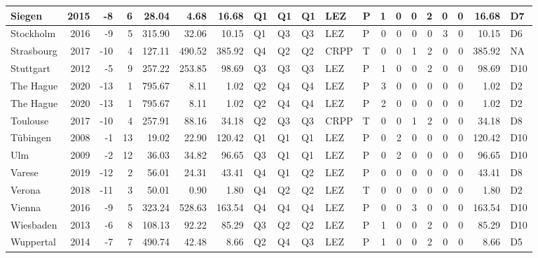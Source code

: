 \begin{tabular}{l|r|r|r|r|r|r|l|l|l|l|l|r|r|r|r|r|r|r|l}
\hline
Siegen & 2015 & -8 & 6 & 28.04 & 4.68 & 16.68 & Q1 & Q1 & Q1 & LEZ & P & 1 & 0 & 0 & 2 & 0 & 0 & 16.68 & D7\\
\hline
Stockholm & 2016 & -9 & 5 & 315.90 & 32.06 & 10.15 & Q1 & Q3 & Q3 & LEZ & P & 0 & 0 & 0 & 0 & 3 & 0 & 10.15 & D6\\
\hline
Strasbourg & 2017 & -10 & 4 & 127.11 & 490.52 & 385.92 & Q4 & Q2 & Q2 & CRPP & T & 0 & 0 & 1 & 2 & 0 & 0 & 385.92 & NA\\
\hline
Stuttgart & 2012 & -5 & 9 & 257.22 & 253.85 & 98.69 & Q3 & Q3 & Q3 & LEZ & P & 1 & 0 & 0 & 2 & 0 & 0 & 98.69 & D10\\
\hline
The Hague & 2020 & -13 & 1 & 795.67 & 8.11 & 1.02 & Q2 & Q4 & Q4 & LEZ & P & 3 & 0 & 0 & 0 & 0 & 0 & 1.02 & D2\\
\hline
The Hague & 2020 & -13 & 1 & 795.67 & 8.11 & 1.02 & Q2 & Q4 & Q4 & LEZ & P & 2 & 0 & 0 & 0 & 0 & 0 & 1.02 & D2\\
\hline
Toulouse & 2017 & -10 & 4 & 257.91 & 88.16 & 34.18 & Q2 & Q3 & Q3 & CRPP & T & 0 & 0 & 1 & 2 & 0 & 0 & 34.18 & D8\\
\hline
Tübingen & 2008 & -1 & 13 & 19.02 & 22.90 & 120.42 & Q1 & Q1 & Q1 & LEZ & P & 0 & 2 & 0 & 0 & 0 & 0 & 120.42 & D10\\
\hline
Ulm & 2009 & -2 & 12 & 36.03 & 34.82 & 96.65 & Q3 & Q1 & Q1 & LEZ & P & 0 & 2 & 0 & 0 & 0 & 0 & 96.65 & D10\\
\hline
Varese & 2019 & -12 & 2 & 56.01 & 24.31 & 43.41 & Q4 & Q1 & Q2 & LEZ & P & 0 & 0 & 0 & 0 & 0 & 0 & 43.41 & D8\\
\hline
Verona & 2018 & -11 & 3 & 50.01 & 0.90 & 1.80 & Q4 & Q2 & Q2 & LEZ & T & 0 & 0 & 0 & 0 & 0 & 0 & 1.80 & D2\\
\hline
Vienna & 2016 & -9 & 5 & 323.24 & 528.63 & 163.54 & Q4 & Q4 & Q4 & LEZ & P & 0 & 0 & 3 & 0 & 0 & 0 & 163.54 & D10\\
\hline
Wiesbaden & 2013 & -6 & 8 & 108.13 & 92.22 & 85.29 & Q3 & Q2 & Q2 & LEZ & P & 1 & 0 & 0 & 2 & 0 & 0 & 85.29 & D10\\
\hline
Wuppertal & 2014 & -7 & 7 & 490.74 & 42.48 & 8.66 & Q2 & Q4 & Q3 & LEZ & P & 1 & 0 & 0 & 2 & 0 & 0 & 8.66 & D5\\
\hline
\end{tabular}
